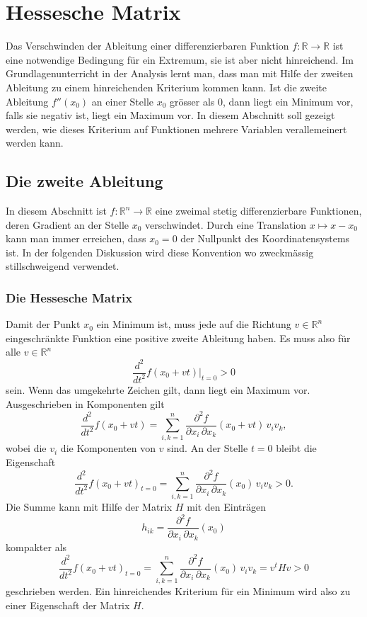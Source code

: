 %
%
%
\section{Hessesche Matrix
\label{buch:fuvar:section:hessesche}}
Das Verschwinden der Ableitung einer differenzierbaren Funktion
$f\colon\mathbb{R}\to\mathbb{R}$ ist eine notwendige Bedingung
für ein Extremum, sie ist aber nicht hinreichend.
Im Grundlagenunterricht in der Analysis lernt man, dass man mit
Hilfe der zweiten Ableitung zu einem hinreichenden Kriterium
kommen kann.
Ist die zweite Ableitung $f''(x_0)$ an einer Stelle $x_0$ grösser
als $0$, dann liegt ein Minimum vor, falls sie negativ ist, liegt
ein Maximum vor.
In diesem Abschnitt soll gezeigt werden, wie dieses Kriterium auf
Funktionen mehrere Variablen verallemeinert werden kann.

%
%
\subsection{Die zweite Ableitung}
In diesem Abschnitt ist $f\colon\mathbb{R}^n\to\mathbb{R}$
eine zweimal stetig differenzierbare Funktionen, deren Gradient
an der Stelle $x_0$ verschwindet.
Durch eine Translation $x\mapsto x-x_0$ kann man immer erreichen,
dass $x_0=0$ der Nullpunkt des Koordinatensystems ist.
In der folgenden Diskussion wird diese Konvention wo zweckmässig
stillschweigend verwendet.

%
%
\subsubsection{Die Hessesche Matrix}
Damit der Punkt $x_0$ ein Minimum ist, muss jede auf die Richtung
$v\in\mathbb{R}^n$ eingeschränkte Funktion eine positive zweite
Ableitung haben.
Es muss also für alle $v\in\mathbb{R}^n$
\[
\frac{d^2}{dt^2} f(x_0+vt)\bigg|_{t=0}
> 0
\]
sein.
Wenn das umgekehrte Zeichen gilt, dann liegt ein Maximum vor.
Ausgeschrieben in Komponenten gilt
\[
\frac{d^2}{dt^2} f(x_0+vt)
=
\sum_{i,k=1}^n
\frac{\partial^2 f}{\partial x_i\,\partial x_k}(x_0+vt)
\,
v_iv_k,
\]
wobei die $v_i$ die Komponenten von $v$ sind.
An der Stelle $t=0$ bleibt die Eigenschaft
\[
\frac{d^2}{dt^2}f(x_0+vt)_{t=0}
=
\sum_{i,k=1}^n \frac{\partial^2 f}{\partial x_i\,\partial x_k}(x_0) \,v_iv_k
>
0.
\]
Die Summe kann mit Hilfe der Matrix $H$ mit den Einträgen
\[
h_{ik}
=
\frac{\partial^2 f}{\partial x_i\,\partial x_k}(x_0)
\]
kompakter als
\[
\frac{d^2}{dt^2}f(x_0+vt)_{t=0}
=
\sum_{i,k=1}^n \frac{\partial^2 f}{\partial x_i\,\partial x_k}(x_0) \,v_iv_k
=
v^tHv
>
0
\]
geschrieben werden.
Ein hinreichendes Kriterium für ein Minimum wird also zu einer
Eigenschaft der Matrix $H$.

